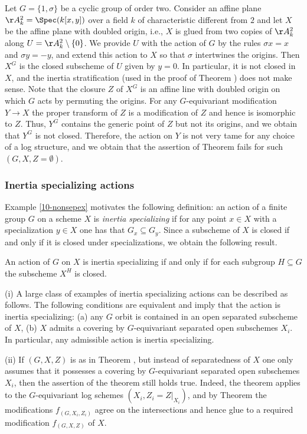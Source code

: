 \documentclass[10pt]{../fichiers-configuration-latex/smfart}
\begin{document}
\begin{example2}\label{10-nonsepex}
Let $G=\{1,\sigma\}$ be a cyclic group of order two. Consider an affine plane
$\AA^2_k=\Spec(k[x,y])$ over a field $k$ of characteristic different from $2$
and let $X$ be the affine plane with doubled origin, i.e., $X$ is glued from two
copies of $\AA^2_k$ along $U=\AA^2_k\setminus\{0\}$. We provide $U$ with the
action of $G$ by the rules $\sigma x=x$ and $\sigma y=-y$, and extend this action
to $X$ so that $\sigma$ intertwines the origins. Then $X^G$ is the closed subscheme
of $U$ given by $y=0$. In particular, it is not closed in $X$, and the inertia
stratification (used in the proof of Theorem )
does not make sense. Note that the closure $Z$ of $X^G$ is an affine line with
doubled origin on which $G$ acts by permuting the origins. For any $G$-equivariant
modification $Y\to X$ the proper transform of $Z$ is a modification of $Z$ and hence
is isomorphic to $Z$. Thus, $Y^G$ contains the generic point of $Z$ but not its origins,
and we obtain that $Y^G$ is not closed. Therefore, the action on $Y$ is not very tame
for any choice of a log structure, and we obtain that the assertion of Theorem
 fails for such $(G,X,Z=\emptyset)$.
\end{example2}

\subsubsection{Inertia specializing actions}
Example \ref{10-nonsepex} motivates the following definition: an action of
a finite group $G$ on a scheme $X$ is {\em inertia specializing} if for any
point $x\in X$ with a specialization $y\in X$ one has that $G_x\subseteq G_y$.
Since a subscheme of $X$ is closed if and only if it is closed under specializations,
we obtain the following result.

\begin{lemma2}
An action of $G$ on $X$ is inertia specializing if and only if for each subgroup
$H\subseteq G$ the subscheme $X^H$ is closed.
\end{lemma2}

\begin{remark2}\label{10-inspecrem}
(i) A large class of examples of inertia specializing actions can be described as follows.
The following conditions are equivalent and imply that the action is inertia specializing:
(a) any $G$ orbit is contained in an open separated subscheme of $X$, (b) $X$ admits
a covering by $G$-equivariant separated open subschemes $X_i$. In particular, any
admissible action is inertia specializing.

(ii) If $(G,X,Z)$ is as in Theorem , but instead of
separatedness of $X$ one only assumes that it possesses a covering by $G$-equivariant
separated open subschemes $X_i$, then the assertion of the theorem still holds true.
Indeed, the theorem applies to the $G$-equivariant log schemes $(X_i,Z_i=Z|_{X_i})$,
and by Theorem  the modifications $f_{(G,X_i,Z_i)}$ agree
on the intersections and hence glue to a required modification $f_{(G,X,Z)}$ of $X$.
\end{remark2}
\end{document}
